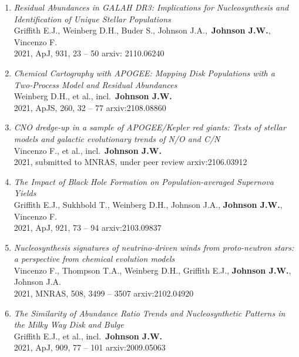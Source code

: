 \documentclass[cv.tex]{subfiles}
\begin{document}
\begin{enumerate}
	\item \textit{Residual Abundances in GALAH DR3: Implications for
	Nucleosynthesis and Identification of Unique Stellar Populations}
	\\
	Griffith E.J., Weinberg D.H., Buder S., Johnson J.A.,~\textbf{Johnson J.W.},
	Vincenzo F.
	\\
	2021, ApJ, 931, 23 -- 50 \hfill arxiv: 2110.06240

	\item \textit{Chemical Cartography with APOGEE: Mapping Disk Populations
	with a Two-Process Model and Residual Abundances}
	\\
	Weinberg D.H., et al., incl.~\textbf{Johnson J.W.}
	\\
	2021, ApJS, 260, 32 -- 77 \hfill arxiv:2108.08860

	\item \textit{CNO dredge-up in a sample of APOGEE/Kepler red giants: Tests
	of stellar models and galactic evolutionary trends of N/O and C/N}
	\\
	Vincenzo F., et al., incl.~\textbf{Johnson J.W.}
	\\
	2021, submitted to MNRAS, under peer review \hfill arxiv:2106.03912

	\item \textit{The Impact of Black Hole Formation on Population-averaged
	Supernova Yields}
	\\
	Griffith E.J., Sukhbold T., Weinberg D.H., Johnson J.A.,
	\textbf{Johnson J.W.}, Vincenzo F.
	\\
	2021, ApJ, 921, 73 -- 94 \hfill arxiv:2103.09837

	\item \textit{Nucleosynthesis signatures of neutrino-driven winds from
	proto-neutron stars: a perspective from chemical evolution models}
	\\
	Vincenzo F., Thompson T.A., Weinberg D.H., Griffith E.J.,
	\textbf{Johnson J.W.}, Johnson J.A.
	\\
	2021, MNRAS, 508, 3499 -- 3507 \hfill arxiv:2102.04920

	\item \textit{The Similarity of Abundance Ratio Trends and Nucleosynthetic
	Patterns in the Milky Way Disk and Bulge}
	\\
	Griffith E.J., et al., incl.~\textbf{Johnson J.W.}
	\\
	2021, ApJ, 909, 77 -- 101 \hfill arxiv:2009.05063

\end{enumerate}
\end{document}
